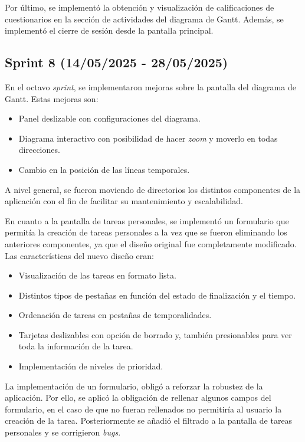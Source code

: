 Por último, se implementó la obtención y visualización de calificaciones de cuestionarios en la sección de actividades del diagrama de Gantt. Además, se implementó el cierre de sesión desde la pantalla principal.

\subsection{Sprint 8 (14/05/2025 - 28/05/2025)}
En el octavo \textit{sprint}, se implementaron mejoras sobre la pantalla del diagrama de Gantt. Estas mejoras son:
\begin{itemize}
    \item Panel deslizable con configuraciones del diagrama.
    \item Diagrama interactivo con posibilidad de hacer \textit{zoom} y moverlo en todas direcciones.
    \item Cambio en la posición de las líneas temporales.
\end{itemize}

A nivel general, se fueron moviendo de directorios los distintos componentes de la aplicación con el fin de facilitar su mantenimiento y escalabilidad.

En cuanto a la pantalla de tareas personales, se implementó un formulario que permitía la creación de tareas personales a la vez que se fueron eliminando los anteriores componentes, ya que el diseño original fue completamente modificado. Las características del nuevo diseño eran:
\begin{itemize}
    \item Visualización de las tareas en formato lista.
    \item Distintos tipos de pestañas en función del estado de finalización y el tiempo.
    \item Ordenación de tareas en pestañas de temporalidades.
    \item Tarjetas deslizables con opción de borrado y, también presionables para ver toda la información de la tarea.
    \item Implementación de niveles de prioridad.
\end{itemize}

La implementación de un formulario, obligó a reforzar la robustez de la aplicación. Por ello, se aplicó la obligación de rellenar algunos campos del formulario, en el caso de que no fueran rellenados no permitiría al usuario la creación de la tarea. Posteriormente se añadió el filtrado a la pantalla de tareas personales y se corrigieron \textit{bugs}. 

